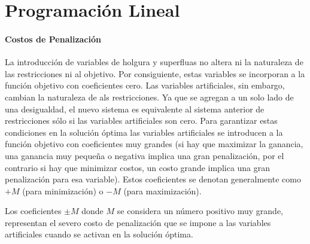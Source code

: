 \section{Programación Lineal}













\paragraph{Costos de Penalización}

La introducción de variables de holgura y superfluas no altera ni la naturaleza de las restricciones ni al objetivo. Por consiguiente, estas variables se incorporan a la función objetivo con coeficientes cero. Las variables artificiales, sin embargo, cambian la naturaleza de als restricciones. Ya que se agregan a un solo lado de una desigualdad, el nuevo sistema es equivalente al sistema anterior de restricciones sólo si las variables artificiales son cero. Para garantizar estas condiciones en la solución óptima las variables artificiales se introducen a la función objetivo con coeficientes muy grandes (si hay que maximizar la ganancia, una ganancia muy pequeña o negativa implica una gran penalización, por el contrario si hay que minimizar costos, un costo grande implica una gran penalización para esa variable). Estos coeficientes se denotan generalmente como \(+M\) (para minimización) o \(-M\) (para maximización).

Los coeficientes \(\pm M\) donde \(M\) se considera un número positivo muy grande, representan el severo costo de penalización que se impone a las variables artificiales cuando se activan en la solución óptima. 